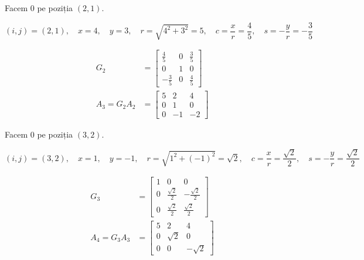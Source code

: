 \documentclass{exam}
\begin{document}
\par Facem 0 pe poziția $(2, 1)$.

\begin{equation*}
	(i, j) = (2, 1), \quad x = 4, \quad y = 3, \quad r = \sqrt{4^2 + 3^2} = 5, \quad c = \frac{x}{r} = \frac{4}{5}, \quad s = -\frac{y}{r} = -\frac{3}{5}
\end{equation*}

\begin{align*}
	G_2           & = \begin{bmatrix}
		                  \frac{4}{5}  & 0 & \frac{3}{5} \\
		                  0            & 1 & 0           \\
		                  -\frac{3}{5} & 0 & \frac{4}{5}
	                  \end{bmatrix} \\
	A_3 = G_2 A_2 & = \begin{bmatrix}
		                  5 & 2  & 4  \\
		                  0 & 1  & 0  \\
		                  0 & -1 & -2
	                  \end{bmatrix}
\end{align*}

\par Facem 0 pe poziția $(3, 2)$.

\begin{equation*}
	(i, j) = (3, 2), \quad x = 1, \quad y = -1, \quad r = \sqrt{1^2 + (-1)^2} = \sqrt{2}, \quad c = \frac{x}{r} = \frac{\sqrt{2}}{2}, \quad s = -\frac{y}{r} = \frac{\sqrt{2}}{2}
\end{equation*}

\begin{align*}
	G_3           & = \begin{bmatrix}
		                  1 & 0                  & 0                   \\
		                  0 & \frac{\sqrt{2}}{2} & -\frac{\sqrt{2}}{2} \\
		                  0 & \frac{\sqrt{2}}{2} & \frac{\sqrt{2}}{2}
	                  \end{bmatrix} \\
	A_4 = G_3 A_3 & = \begin{bmatrix}
		                  5 & 2        & 4         \\
		                  0 & \sqrt{2} & 0         \\
		                  0 & 0        & -\sqrt{2}
	                  \end{bmatrix}
\end{align*}
\end{document}
